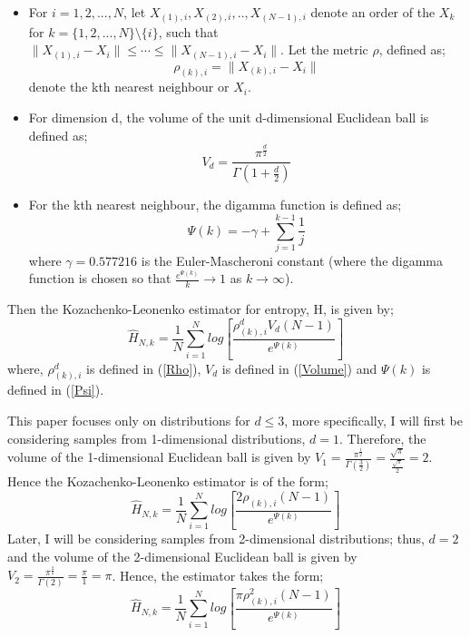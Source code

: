 \documentclass{report}
\begin{document}
\begin{itemize}

\item For $i = 1, 2, ..., N$, let $X_{(1), i}, X_{(2), i}, .., X_{(N-1), i}$ denote an order of the $X_{k}$ for $k = \{1, 2, ..., N\} \setminus \{i\}$, such that $\| X_{(1), i} - X_{i}\| \leq \cdots \leq \|  X_{(N-1), i} - X_{i}\| $. Let the metric $\rho$, defined as;
\begin{equation} \label{Rho}
\rho_{(k), i} = \| X_{(k), i} - X_{i}\|
\end{equation} denote the kth nearest neighbour or $X_{i}$.

\item  For dimension d, the volume of the unit d-dimensional Euclidean ball is defined as;
\begin{equation} \label{Volume}
V_{d} = \frac{\pi^\frac{d}{2}}{\Gamma(1 + \frac{d}{2})}
\end{equation}

\item For the kth nearest neighbour, the digamma function is defined as;
\begin{equation} \label{Psi}
\Psi(k) = -\gamma + \sum_{j=1}^{k-1} \frac{1}{j}
\end{equation}
where $\gamma = 0.577216$ is the Euler-Mascheroni constant (where the digamma function is chosen so that $\frac{e^{\Psi(k)}}{k}\to1$ as $k \to \infty$).

\end{itemize} Then the Kozachenko-Leonenko estimator for entropy, H, is given by;
\begin{equation} \label{KLest}
\hat{H}_{N, k} = \frac{1}{N} \sum_{i=1}^{N} log \left[ \frac{\rho_{(k),i}^{d} V_{d} (N-1)}{e^{\Psi(k)}} \right]
\end{equation} where, $\rho_{(k),i}^{d}$ is defined in (\ref{Rho}), $V_{d}$ is defined in (\ref{Volume}) and $\Psi(k)$ is defined in (\ref{Psi}). 

This paper focuses only on distributions for $d \leq 3$, more specifically, I will first be considering samples from 1-dimensional distributions, $d=1$. Therefore, the volume of the 1-dimensional Euclidean ball is given by $V_{1} = \frac{\pi^{\frac{1}{2}}}{\Gamma (\frac{3}{2})} = \frac{\sqrt{\pi}}{\frac{\sqrt{\pi}}{2}} = 2$. Hence the Kozachenko-Leonenko estimator is of the form;
\begin{equation} \label{KLest_d=1}
\hat{H}_{N, k} = \frac{1}{N} \sum_{i=1}^{N} log \left[ \frac{2\rho_{(k),i}(N-1)}{e^{\Psi(k)}} \right]
\end{equation}
 Later, I will be considering samples from 2-dimensional distributions; thus, $d=2$ and the volume of the 2-dimensional Euclidean ball is given by $V_{2} = \frac{\pi^{\frac{2}{2}}}{\Gamma (2)} = \frac{\pi}{1} = \pi$. Hence, the estimator takes the form;
\begin{equation} \label{KLest_d=2}
\hat{H}_{N, k} = \frac{1}{N} \sum_{i=1}^{N} log \left[ \frac{\pi \rho_{(k),i}^{2} (N-1)}{e^{\Psi(k)}} \right]
\end{equation} 
\end{document}
